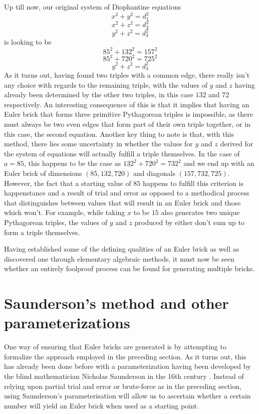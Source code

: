 \documentclass[11pt]{article}
\begin{document}
Up till now, our original system of Diophantine equations
$$x^2+y^2=d_1^2$$
$$x^2+z^2=d_2^2$$
$$y^2+z^2=d_3^2$$
is looking to be
$$85^2+132^2=157^2$$
$$85^2+720^2=725^2$$
$$y^2+z^2=d_3^2$$
As it turns out, having found two triples with a common edge, there really isn't any choice with regards to the remaining triple, with the values of $y$ and $z$ having already been determined by the other two triples, in this case $132$ and $72$ respectively. An interesting consequence of this is that it implies that having an Euler brick that forms three primitive Pythagorean triples is impossible, as there must always be two even edges that form part of their own triple together, or in this case, the second equation. Another key thing to note is that, with this method, there lies some uncertainty in whether the values for $y$ and $z$ derived for the system of equations will actually fulfill a triple themselves. In the case of $a=85$, this happens to be the case as $132^2+720^2=732^2$ and we end up with an Euler brick of dimensions $(85, 132, 720)$ and diagonals $(157, 732, 725)$. However, the fact that a starting value of $85$ happens to fulfill this criterion is happenstance and a result of trial and error as opposed to a methodical process that distinguishes between values that will result in an Euler brick and those which won't. For example, while taking $x$ to be $15$ also generates two unique Pythagorean triples, the values of $y$ and $z$ produced by either don't sum up to form a triple themselves. 

Having established some of the defining qualities of an Euler brick as well as discovered one through elementary algebraic methods, it must now be seen whether an entirely foolproof process can be found for generating multiple bricks.
\section{Saunderson's method and other parameterizations}
One way of ensuring that Euler bricks are generated is by attempting to formalize the approach employed in the preceding section. As it turns out, this has already been done before with a parameterization having been developed by the blind mathematician Nicholas Saunderson in the 16th century \cite[p. 429-431]{saunderson}. Instead of relying upon partial trial and error or brute-force as in the preceding section, using Saunderson's parameterisation will allow us to ascertain whether a certain number will yield an Euler brick when used as a starting point.
\end{document}
